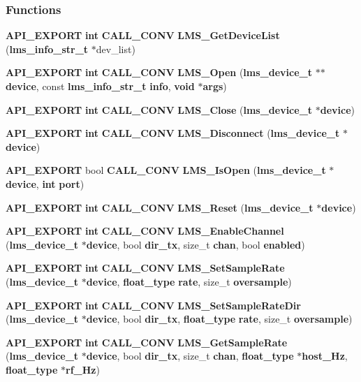 \subsubsection*{Functions}
\begin{DoxyCompactItemize}
\item 
{\bf A\+P\+I\+\_\+\+E\+X\+P\+O\+RT} {\bf int} {\bf C\+A\+L\+L\+\_\+\+C\+O\+NV} {\bf L\+M\+S\+\_\+\+Get\+Device\+List} ({\bf lms\+\_\+info\+\_\+str\+\_\+t} $\ast$dev\+\_\+list)
\item 
{\bf A\+P\+I\+\_\+\+E\+X\+P\+O\+RT} {\bf int} {\bf C\+A\+L\+L\+\_\+\+C\+O\+NV} {\bf L\+M\+S\+\_\+\+Open} ({\bf lms\+\_\+device\+\_\+t} $\ast$$\ast${\bf device}, const {\bf lms\+\_\+info\+\_\+str\+\_\+t} {\bf info}, {\bf void} $\ast${\bf args})
\item 
{\bf A\+P\+I\+\_\+\+E\+X\+P\+O\+RT} {\bf int} {\bf C\+A\+L\+L\+\_\+\+C\+O\+NV} {\bf L\+M\+S\+\_\+\+Close} ({\bf lms\+\_\+device\+\_\+t} $\ast${\bf device})
\item 
{\bf A\+P\+I\+\_\+\+E\+X\+P\+O\+RT} {\bf int} {\bf C\+A\+L\+L\+\_\+\+C\+O\+NV} {\bf L\+M\+S\+\_\+\+Disconnect} ({\bf lms\+\_\+device\+\_\+t} $\ast${\bf device})
\item 
{\bf A\+P\+I\+\_\+\+E\+X\+P\+O\+RT} bool {\bf C\+A\+L\+L\+\_\+\+C\+O\+NV} {\bf L\+M\+S\+\_\+\+Is\+Open} ({\bf lms\+\_\+device\+\_\+t} $\ast${\bf device}, {\bf int} {\bf port})
\item 
{\bf A\+P\+I\+\_\+\+E\+X\+P\+O\+RT} {\bf int} {\bf C\+A\+L\+L\+\_\+\+C\+O\+NV} {\bf L\+M\+S\+\_\+\+Reset} ({\bf lms\+\_\+device\+\_\+t} $\ast${\bf device})
\item 
{\bf A\+P\+I\+\_\+\+E\+X\+P\+O\+RT} {\bf int} {\bf C\+A\+L\+L\+\_\+\+C\+O\+NV} {\bf L\+M\+S\+\_\+\+Enable\+Channel} ({\bf lms\+\_\+device\+\_\+t} $\ast${\bf device}, bool {\bf dir\+\_\+tx}, size\+\_\+t {\bf chan}, bool {\bf enabled})
\item 
{\bf A\+P\+I\+\_\+\+E\+X\+P\+O\+RT} {\bf int} {\bf C\+A\+L\+L\+\_\+\+C\+O\+NV} {\bf L\+M\+S\+\_\+\+Set\+Sample\+Rate} ({\bf lms\+\_\+device\+\_\+t} $\ast${\bf device}, {\bf float\+\_\+type} {\bf rate}, size\+\_\+t {\bf oversample})
\item 
{\bf A\+P\+I\+\_\+\+E\+X\+P\+O\+RT} {\bf int} {\bf C\+A\+L\+L\+\_\+\+C\+O\+NV} {\bf L\+M\+S\+\_\+\+Set\+Sample\+Rate\+Dir} ({\bf lms\+\_\+device\+\_\+t} $\ast${\bf device}, bool {\bf dir\+\_\+tx}, {\bf float\+\_\+type} {\bf rate}, size\+\_\+t {\bf oversample})
\item 
{\bf A\+P\+I\+\_\+\+E\+X\+P\+O\+RT} {\bf int} {\bf C\+A\+L\+L\+\_\+\+C\+O\+NV} {\bf L\+M\+S\+\_\+\+Get\+Sample\+Rate} ({\bf lms\+\_\+device\+\_\+t} $\ast${\bf device}, bool {\bf dir\+\_\+tx}, size\+\_\+t {\bf chan}, {\bf float\+\_\+type} $\ast${\bf host\+\_\+\+Hz}, {\bf float\+\_\+type} $\ast${\bf rf\+\_\+\+Hz})
$$
\end{DoxyCompactItemize}
